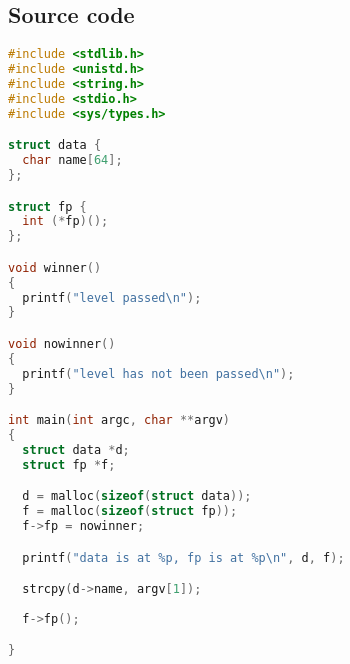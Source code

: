 \subsection*{Source code}

\begin{lstlisting}[language=c]
#include <stdlib.h>
#include <unistd.h>
#include <string.h>
#include <stdio.h>
#include <sys/types.h>

struct data {
  char name[64];
};

struct fp {
  int (*fp)();
};

void winner()
{
  printf("level passed\n");
}

void nowinner()
{
  printf("level has not been passed\n");
}

int main(int argc, char **argv)
{
  struct data *d;
  struct fp *f;

  d = malloc(sizeof(struct data));
  f = malloc(sizeof(struct fp));
  f->fp = nowinner;

  printf("data is at %p, fp is at %p\n", d, f);

  strcpy(d->name, argv[1]);
  
  f->fp();

}
\end{lstlisting}
